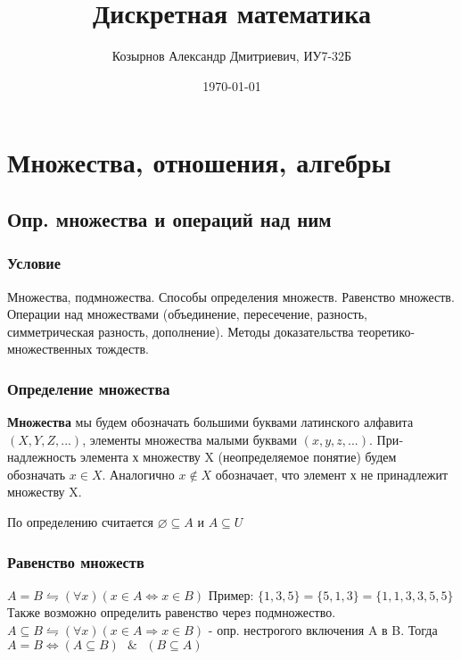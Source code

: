 \documentclass{report}
\title{Дискретная математика}
\author{Козырнов Александр Дмитриевич, ИУ7-32Б}
\date{\today}
\newcommand{\band}{\mbox{ } \& \mbox{ }}
\begin{document}
\maketitle
\tableofcontents
\newpage

\chapter{Множества, отношения, алгебры}
\section{Опр. множества и операций над ним}

\subsection{Условие}
Множества, подмножества. Способы определения множеств. Равенство множеств.
Операции над множествами (объединение, пересечение, разность, симметрическая
разность, дополнение). Методы доказательства теоретико-множественных тождеств.

\subsection{Определение множества}
\textbf{Множества} мы будем обозначать большими буквами латинского алфавита $(X, Y, Z,...)$,
элементы множества малыми буквами $(x, y, z,...)$.
При­надлежность элемента х множеству X (неопределяемое понятие) будем обозначать $x \in X$.
Аналогично $x \notin X$ обозначает, что элемент х не принадлежит множеству X.

По определению считается $\varnothing \subseteq A$ и $A \subseteq U$

\subsection{Равенство множеств}
\textbf{$A = B \leftrightharpoons (\forall x)(x \in A \Leftrightarrow x \in B)$} \newline
Пример:\newline
$\{1,3,5\} = \{5,1,3\} = \{1,1,3,3,5,5\}$ \newline
Также возможно определить равенство через подмножество. \newline
$A \subseteq B \leftrightharpoons (\forall x)(x \in A \Rightarrow x \in B)$ - опр. нестрогого включения A в B.\newline
Тогда \newline
\textbf{$A = B \Leftrightarrow (A \subseteq B) \band (B \subseteq A)$}
\end{document}
